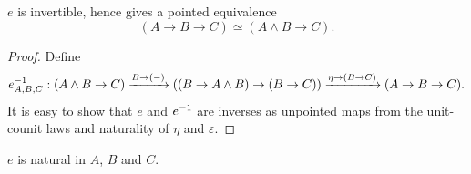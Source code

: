 \documentclass{article}
\newcommand{\pmap}{\to}
\newcommand{\lpmap}{\xrightarrow}
\renewcommand{\smash}{\wedge}
\renewcommand{\epsilon}{\varepsilon}
\renewcommand{\o}{\ensuremath{\circ}}
\begin{document}
\begin{lem}
  $e$ is invertible, hence gives a pointed equivalence $$(A\pmap B\pmap C)\simeq(A\smash B\pmap C).$$
\end{lem}
\begin{proof}
  Define
  $$\inv{e}_{A,B,C}:(A\smash B\pmap C)\lpmap{B\pmap({-})}((B\pmap A\smash B)\pmap (B\pmap
  C))\lpmap{\eta\pmap(B\pmap C)}(A\pmap B\pmap C).$$ It is easy to show that $e$ and ${e}^{-1}$ are
  inverses as unpointed maps from the unit-counit laws and naturality of $\eta$ and $\epsilon$.

\end{proof}
\begin{lem}\label{e-natural}
$e$ is natural in $A$, $B$ and $C$.
\end{lem}
\end{document}
